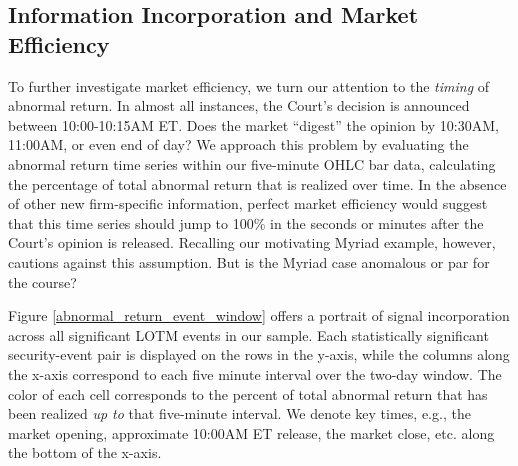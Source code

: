 \documentclass[preprint,12pt]{elsarticle}
\begin{document}
\subsection{Information Incorporation and Market Efficiency}

To further investigate market efficiency, we turn our attention to the \textit{timing} of abnormal return.  In almost all instances, the Court's decision is announced between 10:00-10:15AM ET.  Does the market ``digest'' the opinion by 10:30AM, 11:00AM, or even end of day?  We approach this problem by evaluating the abnormal return time series within our five-minute OHLC bar data, calculating the percentage of total abnormal return that is realized over time.  In the absence of other new firm-specific information, perfect market efficiency would suggest that this time series should jump to 100\% in the seconds or minutes after the Court's opinion is released.  Recalling our motivating Myriad example, however, cautions against this assumption.  But is the Myriad case anomalous or par for the course?  

Figure \ref{abnormal_return_event_window} offers a portrait of signal incorporation across all significant LOTM events in our sample.  Each statistically significant security-event pair is displayed on the rows in the y-axis, while the columns along the x-axis correspond to each five minute interval over the two-day window.  The color of each cell corresponds to the percent of total abnormal return that has been realized \textit{up to} that five-minute interval.  We denote key times, e.g., the market opening, approximate 10:00AM ET release, the market close, etc. along the bottom of the x-axis. 
\end{document}
